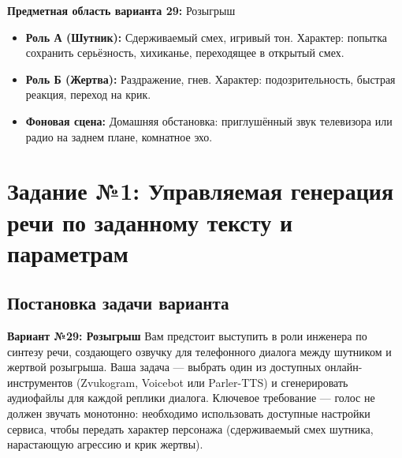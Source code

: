 \documentclass[oneside,a4paper,14pt]{extarticle}
\begin{document}
	\noindent\textbf{Предметная область варианта 29:} Розыгрыш
	\begin{itemize}
		\item \textbf{Роль А (Шутник):} Сдерживаемый смех, игривый тон. Характер: попытка сохранить серьёзность, хихиканье, переходящее в открытый смех.
		\item \textbf{Роль Б (Жертва):} Раздражение, гнев. Характер: подозрительность, быстрая реакция, переход на крик.
		\item \textbf{Фоновая сцена:} Домашняя обстановка: приглушённый звук телевизора или радио на заднем плане, комнатное эхо.
	\end{itemize}
	\newpage
	\section{Задание №1: Управляемая генерация речи по заданному тексту и параметрам}
	\subsection{Постановка задачи варианта}
	\noindent\textbf{Вариант №29: Розыгрыш}
	\noindent Вам предстоит выступить в роли инженера по синтезу речи, создающего озвучку для телефонного диалога между шутником и жертвой розыгрыша. Ваша задача — выбрать один из доступных онлайн-инструментов (Zvukogram, Voicebot или Parler-TTS) и сгенерировать аудиофайлы для каждой реплики диалога. Ключевое требование — голос не должен звучать монотонно: необходимо использовать доступные настройки сервиса, чтобы передать характер персонажа (сдерживаемый смех шутника, нарастающую агрессию и крик жертвы).
	
\end{document}
